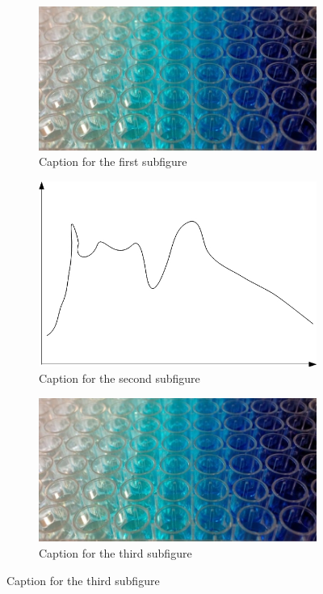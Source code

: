 \begin{figure}[p]
    \centering %
\begin{subfigure}{0.75\textwidth}
  \includegraphics[trim = 30mm 15mm 0mm 20mm, clip,
  width=\linewidth]{pic/anyfigure.png}
  \caption{Caption for the first subfigure}
  \label{fig:1}
\end{subfigure}\hfil %
\begin{subfigure}{7 cm}
  \includegraphics[trim = 30mm 15mm 0mm 20mm, clip, rotate=180, width=\linewidth]{pic/example.jpg}
  \caption{Caption for the second subfigure}
  \label{fig:2}
\end{subfigure}\hfil %

\medskip
\begin{subfigure}{0.75\textwidth}
  \includegraphics[trim = 30mm 15mm 0mm 20mm, clip, width=\linewidth]{pic/anyfigure.png}
  \caption{Caption for the third subfigure}
  \label{fig:3}
\end{subfigure}\hfil %


\end{figure}
